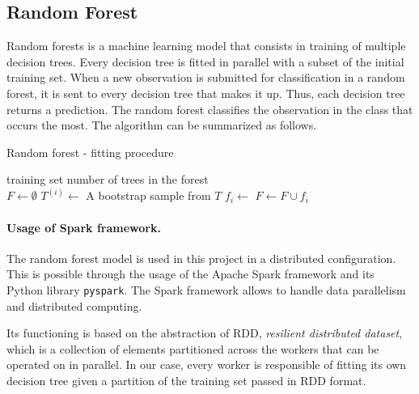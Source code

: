 \documentclass[12pt]{article}
\newcommand{\Desc}[2]{\State \makebox[2em][l]{#1}#2}
\begin{document}
\subsection{Random Forest}
Random forests is a machine learning model that consists in training of multiple decision trees. Every decision tree is fitted in parallel with a subset of the initial training set.
When a new observation is submitted for classification in a random forest, it is sent to every decision tree that makes it up.
Thus, each decision tree returns a prediction.
The random forest classifies the observation in the class that occurs the most.
The algorithm can be summarized as follows.

\begin{algorithm}
\caption{Random forest - fitting procedure}\label{alg:randomForest}
\begin{algorithmic}
\Input
\Desc{$T$}{training set}
\Desc{$n$}{number of trees in the forest}
\EndInput
\\
\State $F \gets \emptyset$
    \State $T^{(i)} \gets$ A bootstrap sample from $T$
    \State $f_i \gets$ 
    \State $F \gets F \cup {f_i}$
\EndFor

\end{algorithmic}
\end{algorithm}



\paragraph{Usage of Spark framework.} The random forest model is used in this project in a distributed configuration.
This is possible through the usage of the Apache Spark framework \cite{SparkUrl} and its Python library \texttt{pyspark}.
The Spark framework allows to handle data parallelism and distributed computing.

Its functioning is based on the abstraction of RDD, \emph{resilient distributed dataset}, which is a collection of elements partitioned across the workers that can be operated on in parallel.
In our case, every worker is responsible of fitting its own decision tree given a partition of the training set passed in RDD format.
\end{document}
